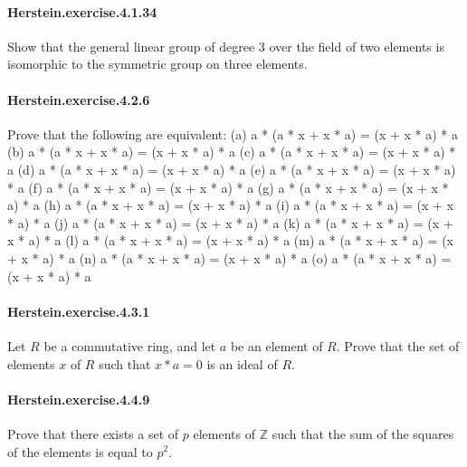 \documentclass{article}
\begin{document}
\paragraph{Herstein.exercise.4.1.34} Show that the general linear group of degree 3 over the field of two elements is isomorphic to the symmetric group on three elements.

\paragraph{Herstein.exercise.4.2.6} Prove that the following are equivalent:
  (a) a * (a * x + x * a) = (x + x * a) * a
  (b) a * (a * x + x * a) = (x + x * a) * a
  (c) a * (a * x + x * a) = (x + x * a) * a
  (d) a * (a * x + x * a) = (x + x * a) * a
  (e) a * (a * x + x * a) = (x + x * a) * a
  (f) a * (a * x + x * a) = (x + x * a) * a
  (g) a * (a * x + x * a) = (x + x * a) * a
  (h) a * (a * x + x * a) = (x + x * a) * a
  (i) a * (a * x + x * a) = (x + x * a) * a
  (j) a * (a * x + x * a) = (x + x * a) * a
  (k) a * (a * x + x * a) = (x + x * a) * a
  (l) a * (a * x + x * a) = (x + x * a) * a
  (m) a * (a * x + x * a) = (x + x * a) * a
  (n) a * (a * x + x * a) = (x + x * a) * a
  (o) a * (a * x + x * a) = (x + x * a) * a
  

\paragraph{Herstein.exercise.4.3.1} Let $R$ be a commutative ring, and let $a$ be an element of $R$. Prove that the set of elements $x$ of $R$ such that $x*a=0$ is an ideal of $R$.

\paragraph{Herstein.exercise.4.4.9} Prove that there exists a set of $p$ elements of $\mathbb{Z}$ such that the sum of the squares of the elements is equal to $p^2$.
\end{document}
